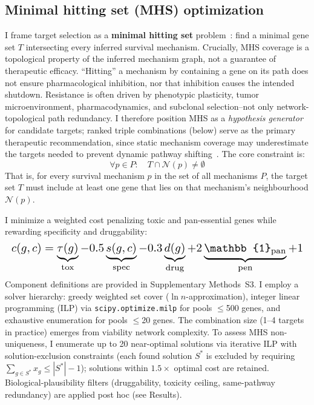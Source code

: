 \documentclass[11pt]{article}
\begin{document}
\subsection*{Minimal hitting set (MHS) optimization}
I frame target selection as a \textbf{minimal hitting set} problem~\cite{VeraLicona2013,Murakami2017}: find a minimal gene set $T$ intersecting every inferred survival mechanism. Crucially, MHS coverage is a topological property of the inferred mechanism graph, not a guarantee of therapeutic efficacy. ``Hitting'' a mechanism by containing a gene on its path does not ensure pharmacological inhibition, nor that inhibition causes the intended shutdown. Resistance is often driven by phenotypic plasticity, tumor microenvironment, pharmacodynamics, and subclonal selection--not only network-topological path redundancy. I therefore position MHS as a \emph{hypothesis generator} for candidate targets; ranked triple combinations (below) serve as the primary therapeutic recommendation, since static mechanism coverage may underestimate the targets needed to prevent dynamic pathway shifting~\cite{Liaki2025}. The core constraint is:
\begin{equation}
\forall p \in P: \quad T \cap \mathcal{N}(p) \neq \emptyset
\end{equation}
That is, for every survival mechanism $p$ in the set of all mechanisms $P$, the target set $T$ must include at least one gene that lies on that mechanism's neighbourhood $\mathcal{N}(p)$.

I minimize a weighted cost penalizing toxic and pan-essential genes while rewarding specificity and druggability:
\begin{equation}
\resizebox{\columnwidth}{!}{$\displaystyle
c(g, c) = \underbrace{\tau(g)}_{\text{tox}} - 0.5\underbrace{s(g,c)}_{\text{spec}} - 0.3\underbrace{d(g)}_{\text{drug}} + 2\underbrace{\mathbb{1}_{\text{pan}}}_{\text{pen}} + 1
$}
\end{equation}
Component definitions are provided in Supplementary Methods~S3. I employ a solver hierarchy: greedy weighted set cover ($\ln n$-approximation), integer linear programming (ILP) via \texttt{scipy.optimize.milp} for pools $\leq$500 genes, and exhaustive enumeration for pools $\leq$20 genes. The combination size (1--4 targets in practice) emerges from viability network complexity. To assess MHS non-uniqueness, I enumerate up to 20 near-optimal solutions via iterative ILP with solution-exclusion constraints (each found solution $S^*$ is excluded by requiring $\sum_{g \in S^*} x_g \leq |S^*| - 1$); solutions within $1.5\times$ optimal cost are retained. Biological-plausibility filters (druggability, toxicity ceiling, same-pathway redundancy) are applied post hoc (see Results).
\end{document}
